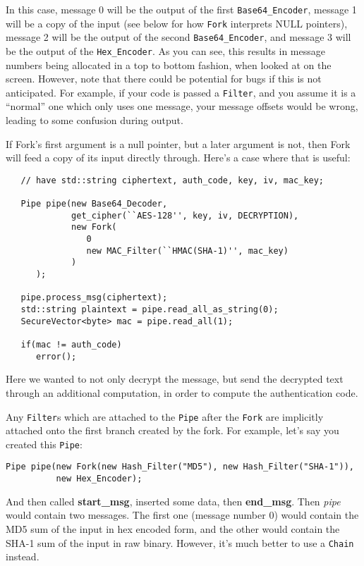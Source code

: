 \documentclass{article}
\newcommand{\function}[1]{\textbf{#1}}
\newcommand{\type}[1]{\texttt{#1}}
\renewcommand{\arg}[1]{\textsl{#1}}
\begin{document}
In this case, message 0 will be the output of the first \type{Base64\_Encoder},
message 1 will be a copy of the input (see below for how \type{Fork} interprets
NULL pointers), message 2 will be the output of the second
\type{Base64\_Encoder}, and message 3 will be the output of the
\type{Hex\_Encoder}. As you can see, this results in message numbers being
allocated in a top to bottom fashion, when looked at on the screen. However,
note that there could be potential for bugs if this is not anticipated. For
example, if your code is passed a \type{Filter}, and you assume it is a
``normal'' one which only uses one message, your message offsets would be
wrong, leading to some confusion during output.

If Fork's first argument is a null pointer, but a later argument is
not, then Fork will feed a copy of its input directly through. Here's
a case where that is useful:

\begin{verbatim}
   // have std::string ciphertext, auth_code, key, iv, mac_key;

   Pipe pipe(new Base64_Decoder,
             get_cipher(``AES-128'', key, iv, DECRYPTION),
             new Fork(
                0
                new MAC_Filter(``HMAC(SHA-1)'', mac_key)
             )
      );

   pipe.process_msg(ciphertext);
   std::string plaintext = pipe.read_all_as_string(0);
   SecureVector<byte> mac = pipe.read_all(1);

   if(mac != auth_code)
      error();
\end{verbatim}

Here we wanted to not only decrypt the message, but send the decrypted
text through an additional computation, in order to compute the
authentication code.

Any \type{Filter}s which are attached to the \type{Pipe} after the
\type{Fork} are implicitly attached onto the first branch created by
the fork. For example, let's say you created this \type{Pipe}:

\begin{verbatim}
Pipe pipe(new Fork(new Hash_Filter("MD5"), new Hash_Filter("SHA-1")),
          new Hex_Encoder);
\end{verbatim}

And then called \function{start\_msg}, inserted some data, then
\function{end\_msg}. Then \arg{pipe} would contain two messages. The
first one (message number 0) would contain the MD5 sum of the input in
hex encoded form, and the other would contain the SHA-1 sum of the
input in raw binary. However, it's much better to use a \type{Chain}
instead.
\end{document}
